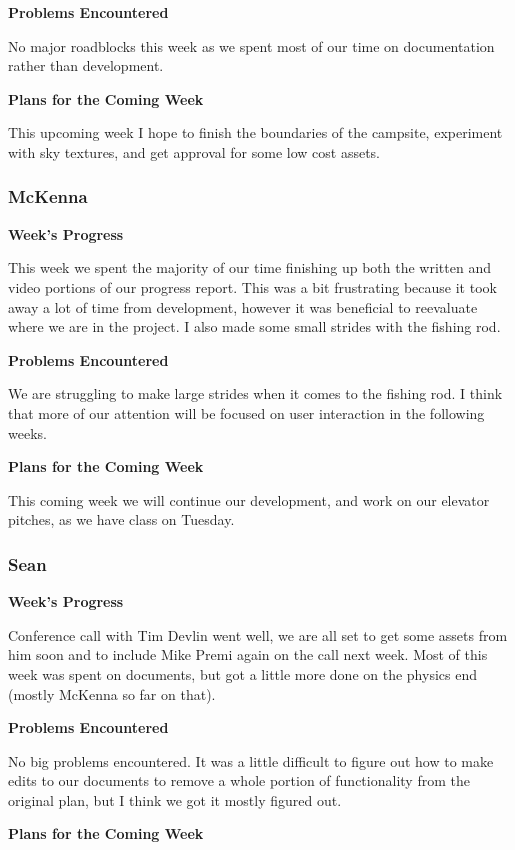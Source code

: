 \documentclass[10pt,journal,compsoc,onecolumn, draftclsnofoot]{IEEEtran}
\begin{document}
\noindent \textbf{Problems Encountered}

No major roadblocks this week as we spent most of our time on documentation rather than development.

\noindent \textbf{Plans for the Coming Week}

This upcoming week I hope to finish the boundaries of the campsite, experiment with sky textures, and get approval for some low cost assets.

\subsubsection{McKenna}
\noindent \textbf{Week's Progress}

This week we spent the majority of our time finishing up both the written and video portions of our progress report. This was a bit frustrating because it took away a lot of time from development, however it was beneficial to reevaluate where we are in the project. I also made some small strides with the fishing rod.

\noindent \textbf{Problems Encountered}

We are struggling to make large strides when it comes to the fishing rod. I think that more of our attention will be focused on user interaction in the following weeks.

\noindent \textbf{Plans for the Coming Week}

This coming week we will continue our development, and work on our elevator pitches, as we have class on Tuesday.

\subsubsection{Sean}
\noindent \textbf{Week's Progress}

Conference call with Tim Devlin went well, we are all set to get some assets from him soon and to include Mike Premi again on the call next week.  Most of this week was spent on documents, but got a little more done on the physics end (mostly McKenna so far on that).

\noindent \textbf{Problems Encountered}

No big problems encountered.  It was a little difficult to figure out how to make edits to our documents to remove a whole portion of functionality from the original plan, but I think we got it mostly figured out.

\noindent \textbf{Plans for the Coming Week}
\end{document}
